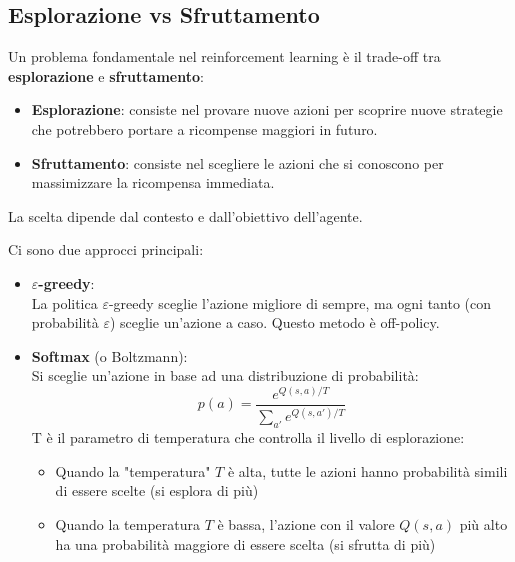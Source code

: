 \documentclass[a4paper]{article}
\begin{document}
\subsection{Esplorazione vs Sfruttamento}
Un problema fondamentale nel reinforcement learning è il trade-off tra
\textbf{esplorazione} e \textbf{sfruttamento}:
\begin{itemize}
  \item \textbf{Esplorazione}: consiste nel provare nuove azioni per scoprire
    nuove strategie che potrebbero portare a ricompense maggiori in futuro.

  \item \textbf{Sfruttamento}: consiste nel scegliere le azioni che si conoscono
    per massimizzare la ricompensa immediata.
\end{itemize}
La scelta dipende dal contesto e dall'obiettivo dell'agente.

Ci sono due approcci principali:
\begin{itemize}
  \item \textbf{\( \varepsilon \)-greedy}:\\
    La politica \( \varepsilon\)-greedy sceglie l'azione migliore di sempre, ma ogni tanto
    (con probabilità \( \varepsilon \)) sceglie un'azione a caso. Questo metodo è off-policy.

  \item \textbf{Softmax} (o Boltzmann):\\
    Si sceglie un'azione in base ad una distribuzione di probabilità:
    \[
      p(a) = \frac{e^{Q(s,a)/T}}{\sum_{a'} e^{Q(s,a')/T}}
    \] 
    T è il parametro di temperatura che controlla il livello di esplorazione:
    \begin{itemize}
      \item Quando la "temperatura" \( T \) è alta, tutte le azioni hanno probabilità simili
        di essere scelte (si esplora di più)
      \item Quando la temperatura \( T \) è bassa, l'azione con il valore \( Q(s,a) \)
        più alto ha una probabilità maggiore di essere scelta (si sfrutta di più)
    \end{itemize}
\end{itemize}
\end{document}
